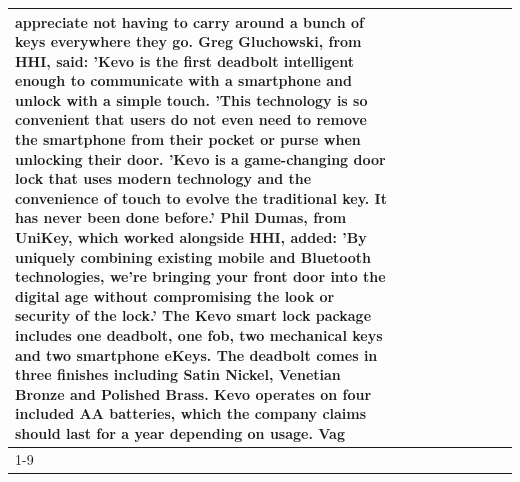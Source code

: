 \begin{table}[H]
\begin{tabular}{lllrlllll}
appreciate not having to carry around a bunch of keys everywhere they go. Greg Gluchowski, from HHI, said: 'Kevo is the first deadbolt intelligent enough to communicate with a smartphone and unlock with a simple touch. 'This technology is so convenient that users do not even need to remove the smartphone from their pocket or purse when unlocking their door. 'Kevo is a game-changing door lock that uses modern technology and the convenience of touch to evolve the traditional key. It has never been done before.' Phil Dumas, from UniKey, which worked alongside HHI, added: 'By uniquely combining existing mobile and Bluetooth technologies, we’re bringing your front door into the digital age without compromising the look or security of the lock.' The Kevo smart lock package includes one deadbolt, one fob, two mechanical keys and two smartphone eKeys. The deadbolt comes in three finishes including Satin Nickel, Venetian Bronze and Polished Brass. Kevo operates on four included AA batteries, which the company claims should last for a year depending on usage. Vag \\
\cline{1-9}

\end{tabular}
\end{table}
